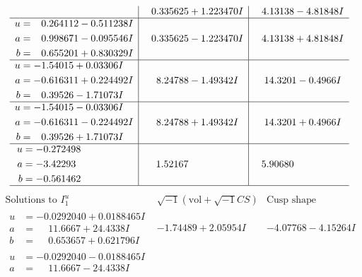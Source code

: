 \documentclass[1p]{elsarticle_modified}
\theoremstyle{definition}
\newcommand{\I}{\sqrt{-1}}
\begin{document}
$$\begin{array}{c|c|c}
 & \phantom{-}0.335625 + 1.223470 I & \phantom{-}4.13138 - 4.81848 I \\ \hline\begin{aligned}
u &= \phantom{-}0.264112 - 0.511238 I \\
a &= \phantom{-}0.998671 - 0.095546 I \\
b &= \phantom{-}0.655201 + 0.830329 I\end{aligned}
 & \phantom{-}0.335625 - 1.223470 I & \phantom{-}4.13138 + 4.81848 I \\ \hline\begin{aligned}
u &= -1.54015 + 0.03306 I \\
a &= -0.616311 + 0.224492 I \\
b &= \phantom{-}0.39526 - 1.71073 I\end{aligned}
 & \phantom{-}8.24788 - 1.49342 I & \phantom{-}14.3201 - 0.4966 I \\ \hline\begin{aligned}
u &= -1.54015 - 0.03306 I \\
a &= -0.616311 - 0.224492 I \\
b &= \phantom{-}0.39526 + 1.71073 I\end{aligned}
 & \phantom{-}8.24788 + 1.49342 I & \phantom{-}14.3201 + 0.4966 I \\ \hline\begin{aligned}
u &= -0.272498\phantom{ +0.000000I} \\
a &= -3.42293\phantom{ +0.000000I} \\
b &= -0.561462\phantom{ +0.000000I}\end{aligned}
 & \phantom{-}1.52167\phantom{ +0.000000I} & \phantom{-}5.90680\phantom{ +0.000000I}\\
 \hline 
 \end{array}$$\newpage$$\begin{array}{c|c|c}  
\text{Solutions to }I^u_{1}& \I (\text{vol} + \sqrt{-1}CS) & \text{Cusp shape}\\
 \hline 
\begin{aligned}
u &= -0.0292040 + 0.0188465 I \\
a &= \phantom{-}11.6667 + 24.4338 I \\
b &= \phantom{-}0.653657 + 0.621796 I\end{aligned}
 & -1.74489 + 2.05954 I & -4.07768 - 4.15264 I \\ \hline\begin{aligned}
u &= -0.0292040 - 0.0188465 I \\
a &= \phantom{-}11.6667 - 24.4338 I \\

\end{aligned}
\end{array}$$
\end{document}
